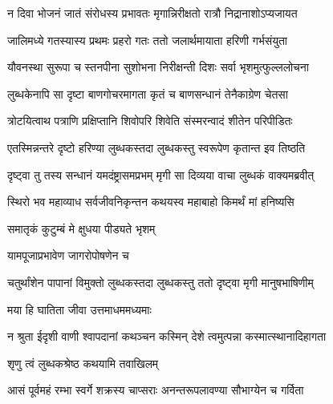 \twolineshloka
{न दिवा भोजनं जातं संरोधस्य प्रभावतः}
{मृगान्निरीक्षतो रात्रौ निद्रानाशोऽप्यजायत}%

\twolineshloka
{जालिमध्ये गतस्यास्य प्रथमः प्रहरो गतः}
{ततो जलार्थमायाता हरिणी गर्भसंयुता}%

\twolineshloka
{यौवनस्था सुरूपा च स्तनपीना सुशोभना}
{निरीक्षन्ती दिशः सर्वा भृशमुत्फुल्ललोचना}%

\twolineshloka
{लुब्धकेनापि सा दृष्टा बाणगोचरमागता}
{कृतं च बाणसन्धानं तेनैकाग्रेण चेतसा}%

\twolineshloka
{त्रोटयित्वाथ पत्राणि प्रक्षिप्तानि शिवोपरि}
{शिवेति संस्मरन्वादं शीतेन परिपीडितः}%

\twolineshloka
{एतस्मिन्नन्तरे दृष्टो हरिण्या लुब्धकस्तदा}
{लुब्धकस्तु स्वरूपेण कृतान्त इव तिष्ठति}%

\twolineshloka
{दृष्ट्वा तु तस्य सन्धानं यमदंष्ट्रासमप्रभम्}
{मृगी सा दिव्यया वाचा लुब्धकं वाक्यमब्रवीत्}%


\twolineshloka
{स्थिरो भव महाव्याध सर्वजीवनिकृन्तन}
{कथयस्व महाबाहो किमर्थं मां हनिष्यसि}%



\onelineshloka
{समातृकं कुटुम्बं मे क्षुधया पीड्यते भृशम्}%



\onelineshloka
{याम\footnotemark{}पूजाप्रभावेण जागरोपोषणेन च}%

\twolineshloka
{चतुर्थांशेन पापानां विमुक्तो लुब्धकस्तदा}
{लुब्धकस्तु ततो दृष्ट्वा मृगी मानुषभाषिणीम्}%


\onelineshloka
{मया हि घातिता जीवा उत्तमाधममध्यमाः}%

\twolineshloka
{न श्रुता ईदृशी वाणी श्वापदानां कथञ्चन}
{कस्मिन् देशे त्वमुत्पन्ना कस्मात्स्थानादिहागता}%


\onelineshloka
{शृणु त्वं लुब्धकश्रेष्ठ कथयामि तवाखिलम्}%

\twolineshloka
{आसं पूर्वमहं रम्भा स्वर्गे शक्रस्य चाप्सराः}
{अनन्तरूपलावण्या सौभाग्येन च गर्विता}%

